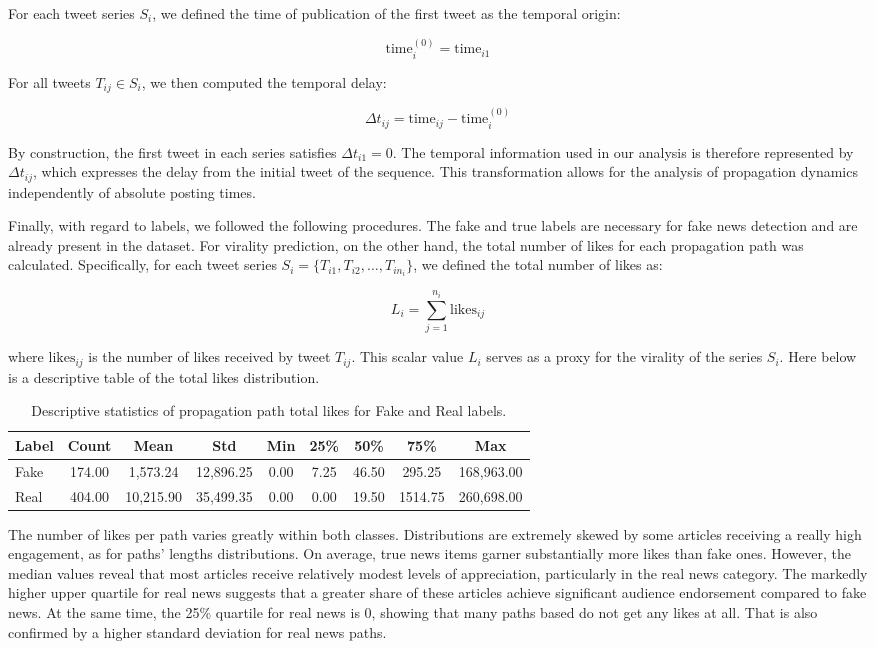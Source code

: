 \documentclass[a4paper,twoside,12pt]{book}
\begin{document}
For each tweet series $S_i$, we defined the time of publication of the first tweet as the temporal origin:

$$
\text{time}_i^{(0)} = \text{time}_{i1}
$$

For all tweets $T_{ij} \in S_i$, we then computed the temporal delay:

$$
\Delta t_{ij} = \text{time}_{ij} - \text{time}_i^{(0)}
$$

By construction, the first tweet in each series satisfies $\Delta t_{i1} = 0$. The temporal information used in our analysis is therefore represented by $\Delta t_{ij}$, which expresses the delay from the initial tweet of the sequence. This transformation allows for the analysis of propagation dynamics independently of absolute posting times. 

\pagebreak

Finally, with regard to labels, we followed the following procedures. The fake and true labels are necessary for fake news detection and are already present in the dataset. For virality prediction, on the other hand, the total number of likes for each propagation path was calculated. Specifically, for each tweet series $S_i = \{ T_{i1}, T_{i2}, \dots, T_{in_i} \}$, we defined the total number of likes as:

$$
L_i = \sum_{j=1}^{n_i} \text{likes}_{ij}
$$

where $\text{likes}_{ij}$ is the number of likes received by tweet $T_{ij}$. This scalar value $L_i$ serves as a proxy for the virality of the series $S_i$. Here below is a descriptive table of the total likes distribution. \\

\begin{table}[h!]
	\centering
	\begin{tabular}{lcccccccc}
		\toprule
		Label & Count & Mean & Std & Min & 25\% & 50\% & 75\% & Max \\
		\midrule
		Fake & 174.00 & 1,573.24 & 12,896.25 & 0.00 & 7.25 & 46.50 & 295.25 & 168,963.00 \\
		Real & 404.00 & 10,215.90 & 35,499.35 & 0.00 & 0.00 & 19.50 & 1514.75 & 260,698.00 \\
		\bottomrule
	\end{tabular}
	\caption{Descriptive statistics of propagation path total likes for Fake and Real labels.}
	\label{tab:stats_likes_paths}
\end{table}

The number of likes per path varies greatly within both classes. Distributions are extremely skewed by some articles receiving a really high engagement, as for paths' lengths distributions. On average, true news items garner substantially more likes than fake ones. However, the median values reveal that most articles receive relatively modest levels of appreciation, particularly in the real news category. The markedly higher upper quartile for real news suggests that a greater share of these articles achieve significant audience endorsement compared to fake news. At the same time, the 25\% quartile for real news is 0, showing that many paths based do not get any likes at all. That is also confirmed by a higher standard deviation for real news paths. \\
\end{document}

